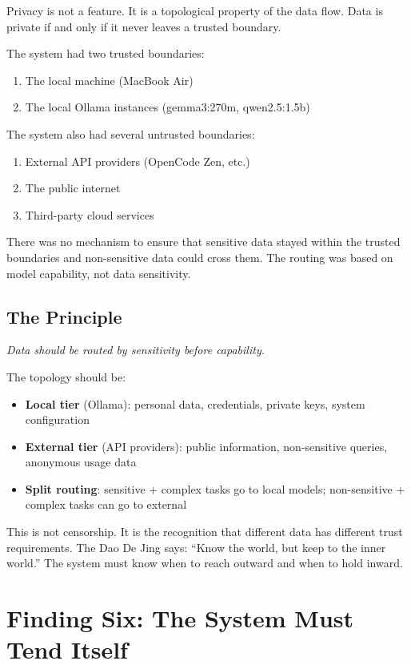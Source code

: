 \documentclass[12pt,a4paper,oneside]{book}
\begin{document}
Privacy is not a feature. It is a topological property of the data flow. Data is private if and only if it never leaves a trusted boundary.

The system had two trusted boundaries:
\begin{enumerate}
  \item The local machine (MacBook Air)
  \item The local Ollama instances (gemma3:270m, qwen2.5:1.5b)
\end{enumerate}

The system also had several untrusted boundaries:
\begin{enumerate}
  \item External API providers (OpenCode Zen, etc.)
  \item The public internet
  \item Third-party cloud services
\end{enumerate}

There was no mechanism to ensure that sensitive data stayed within the trusted boundaries and non-sensitive data could cross them. The routing was based on model capability, not data sensitivity.

\section{The Principle}

\emph{Data should be routed by sensitivity before capability.}

The topology should be:
\begin{itemize}
  \item \textbf{Local tier} (Ollama): personal data, credentials, private keys, system configuration
  \item \textbf{External tier} (API providers): public information, non-sensitive queries, anonymous usage data
  \item \textbf{Split routing}: sensitive + complex tasks go to local models; non-sensitive + complex tasks can go to external
\end{itemize}

This is not censorship. It is the recognition that different data has different trust requirements. The Dao De Jing says: \enquote{Know the world, but keep to the inner world.} The system must know when to reach outward and when to hold inward.

\chapter{Finding Six: The System Must Tend Itself}
\end{document}
